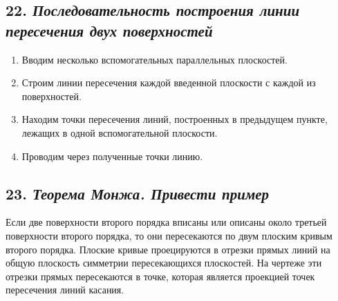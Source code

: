 
\newpage
\subsection*{22. \textit{Последовательность построения линии пересечения двух поверхностей}}

\begin{mainQuote}
\end{mainQuote}

\begin{enumerate}
    \item Вводим несколько вспомогательных параллельных плоскостей.
    \item Строим линии пересечения каждой введенной плоскости с каждой из поверхностей.
    \item Находим точки пересечения линий, построенных в предыдущем пункте, лежащих в одной вспомогательной плоскости.
    \item Проводим через полученные точки линию.
\end{enumerate}


\newpage
\subsection*{23. \textit{Теорема Монжа. Привести пример}}

\begin{mainQuote}
    
\end{mainQuote}

Если две поверхности второго порядка вписаны или описаны около третьей поверхности второго порядка, то они пересекаются по двум плоским кривым второго порядка. Плоские кривые проецируются в отрезки прямых линий на общую плоскость симметрии пересекающихся плоскостей. На чертеже эти отрезки прямых пересекаются в точке, которая является проекцией точек пересечения линий касания.



